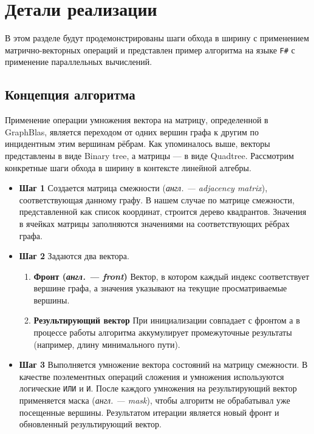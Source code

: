
\section{Детали реализации}
В этом разделе будут продемонстрированы шаги обхода в ширину с применением матрично-векторных операций и представлен пример алгоритма на языке \texttt{F\#} с применение параллельных вычислений.



\subsection{Концепция алгоритма}
Применение операции умножения вектора на матрицу, определенной в GraphBlas, является переходом от одних вершин графа к другим по инцидентным этим вершинам рёбрам.
Как упоминалось выше, векторы представлены в виде Binary tree, а матрицы --- в виде Quadtree. Рассмотрим конкретные шаги обхода в ширину в контексте линейной алгебры.
\begin{itemize}
    \item{\textbf{Шаг 1}} \newline Создается матрица смежности (\textit{англ. --- adjacency matrix}), соответствующая данному графу. В нашем случае по матрице смежности, представленной как список координат, строится дерево квадрантов. Значения в ячейках матрицы заполняются значениями на соответствующих рёбрах графа.
    \item{\textbf{Шаг 2}} \newline Задаются два вектора.
    \begin{enumerate}
        \item{\textbf{Фронт (\textit{англ. --- front})}} \newline Вектор, в котором каждый индекс соответствует вершине графа, а значения указывают на текущие просматриваемые вершины.
        \item{\textbf{Результирующий вектор}} \newline 
        При инициализации совпадает с фронтом а в процессе работы алгоритма аккумулирует промежуточные результаты (например, длину минимального пути).
    \end{enumerate}
    \item{\textbf{Шаг 3}} \newline Выполняется умножение вектора состояний на матрицу смежности. В качестве поэлементных операций сложения и умножения используются логические \texttt{ИЛИ} и \texttt{И}. После каждого умножения на результирующий вектор применяется маска (\textit{англ. --- mask}), чтобы алгоритм не обрабатывал уже посещенные вершины. Результатом итерации является новый фронт и обновленный результирующий вектор.
\end{itemize}

